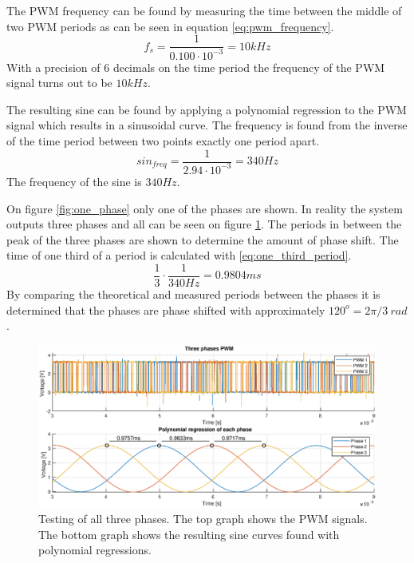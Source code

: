 The PWM frequency can be found by measuring the time between the middle of two PWM periods as can be seen in equation \ref{eq:pwm_frequency}. 
\begin{equation}
    f_s = \frac{1}{0.100 \cdot 10^{-3}} = 10kHz
    \label{eq:pwm_frequency}
\end{equation}
With a precision of 6 decimals on the time period the frequency of the PWM signal turns out to be $10kHz$.

The resulting sine can be found by applying a polynomial regression to the PWM signal which results in a sinusoidal curve. The frequency is found from the inverse of the time period between two points exactly one period apart. 
\begin{equation}
    sin_{freq} = \frac{1}{2.94 \cdot 10^{-3}} = 340 Hz
\end{equation}
The frequency of the sine is $340Hz$.

On figure \ref{fig:one_phase} only one of the phases are shown. In reality the system outputs three phases and all can be seen on figure \ref{fig:three_phases}. The periods in between the peak of the three phases are shown to determine the amount of phase shift. The time of one third of a period is calculated with \ref{eq:one_third_period}.
\begin{equation}
    \frac{1}{3} \cdot \frac{1}{340 Hz} = 0.9804ms
    \label{eq:one_third_period}
\end{equation}
By comparing the theoretical and measured periods between the phases it is determined that the phases are phase shifted with approximately $120^o = 2 \pi / 3 \ rad$.
\begin{figure}[H]
	\centering
	\includegraphics[width=1 \textwidth]{pictures/software/three_phases.eps}
	\caption{Testing of all three phases. The top graph shows the PWM signals. The bottom graph shows the resulting sine curves found with polynomial regressions.}
	\label{fig:three_phases}
\end{figure}
